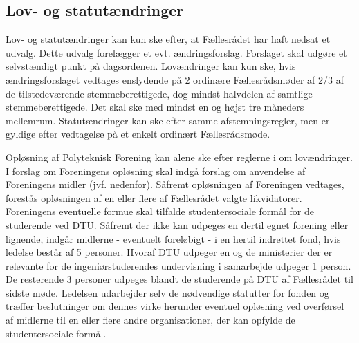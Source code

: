 \begin{list}

\subsection{Lov- og statutændringer}
\item \label{L:LS:lovaedringer} Lov- og statutændringer kan kun ske efter, at Fællesrådet har haft nedsat et udvalg. Dette udvalg forelægger et evt. ændringsforslag. Forslaget skal udgøre et selvstændigt punkt på dagsordenen. Lovændringer kan kun ske, hvis ændringsforslaget vedtages enslydende på 2 ordinære Fællesrådsmøder af 2/3 af de tilstedeværende stemmeberettigede, dog mindst halvdelen af samtlige stemmeberettigede. Det skal ske med mindst en og højst tre måneders mellemrum. Statutændringer kan ske efter samme afstemningsregler, men er gyldige efter vedtagelse på et enkelt ordinært Fællesrådsmøde.

\item \label{L:LS:oploesning} Opløsning af Polyteknisk Forening kan alene ske efter reglerne i  om lovændringer. I forslag om Foreningens opløsning skal indgå forslag om anvendelse af Foreningens midler (jvf. nedenfor). Såfremt opløsningen af Foreningen vedtages, forestås opløsningen af en eller flere af Fællesrådet valgte likvidatorer. Foreningens eventuelle formue skal tilfalde studentersociale formål for de studerende ved DTU. Såfremt der ikke kan udpeges en dertil egnet forening eller lignende, indgår midlerne - eventuelt foreløbigt - i en hertil indrettet fond, hvis ledelse består af 5 personer. Hvoraf DTU udpeger en og de ministerier der er relevante for de ingeniørstuderendes undervisning i samarbejde udpeger 1 person. De resterende 3 personer udpeges blandt de studerende på DTU af Fællesrådet til sidste møde. Ledelsen udarbejder selv de nødvendige statutter for fonden og træffer beslutninger om dennes virke herunder eventuel opløsning ved overførsel af midlerne til en eller flere andre organisationer, der kan opfylde de studentersociale formål.

\end{list}